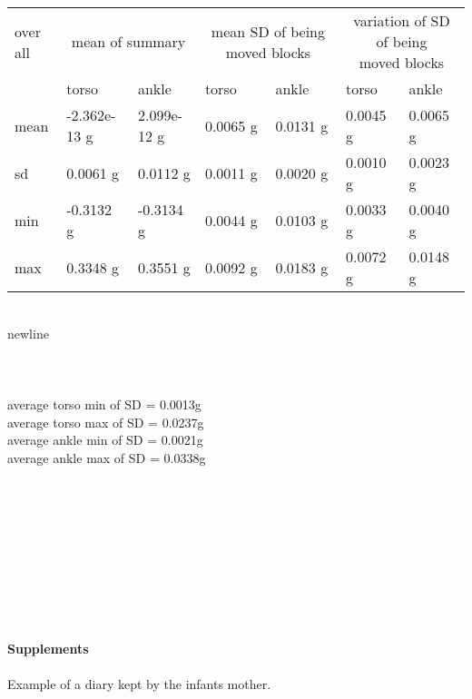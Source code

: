 \documentclass{article}
\begin{document}
\newpage
\begin{narrow}
\begin{table}[h]
\begin{tabular}{|p{1.2cm}|p{2cm}|p{2cm}|p{2cm}|p{2cm}|p{2cm}|p{2cm}|}
\hline
over all &\multicolumn{2}{c|}{mean of summary} &\multicolumn{2}{c|}{mean SD of being moved blocks} & \multicolumn{2}{c|}{\parbox[c]{4cm}{variation of SD of being\\moved blocks}}\\ \cline{2-7} 
         & torso & ankle & torso & ankle & torso & ankle \\ \hline
mean     & -2.362e-13 g & 2.099e-12 g & 0.0065 g & 0.0131 g & 0.0045 g & 0.0065 g \\ \hline
sd       & 0.0061 g & 0.0112 g & 0.0011 g & 0.0020 g & 0.0010 g & 0.0023 g \\ \hline
min      & -0.3132 g & -0.3134 g & 0.0044 g & 0.0103 g & 0.0033 g & 0.0040 g \\ \hline
max      & 0.3348 g & 0.3551 g & 0.0092 g & 0.0183 g & 0.0072 g & 0.0148 g \\ \hline
\end{tabular}
\end{table}
\end{narrow}
\\

newline\\
\\
\\
\\
average torso min of SD = 0.0013g\\
average torso max of SD = 0.0237g\\
average ankle min of SD = 0.0021g\\
average ankle max of SD = 0.0338g\\
\newpage
\begin{thebibliography}{99} 
\end{thebibliography}
\\
\\
\\
\\
\\
\\
\\
\\
\\
\Large{\textbf{Supplements}}
\\
\\
\normalsize Example of a diary kept by the infants mother.

\end{document}

